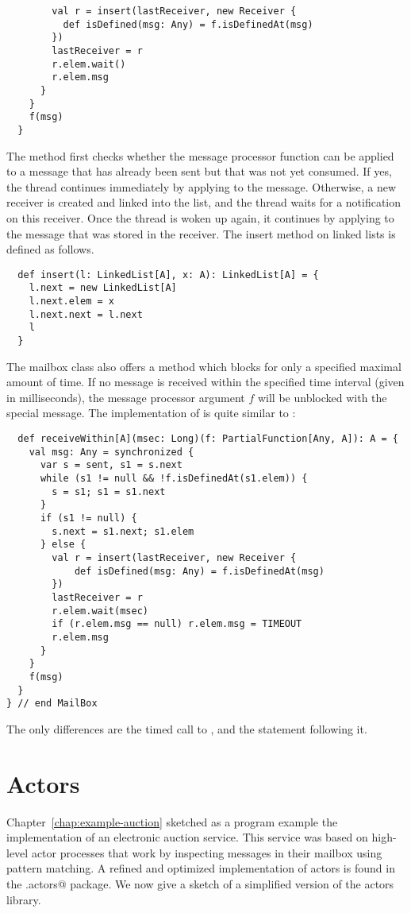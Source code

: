 {\begin{lstlisting}
        val r = insert(lastReceiver, new Receiver {
          def isDefined(msg: Any) = f.isDefinedAt(msg)
        })
        lastReceiver = r
        r.elem.wait()
        r.elem.msg
      }
    }
    f(msg)
  }
\end{lstlisting}
The  method first checks whether the message processor function
 can be applied to a message that has already been sent but that
was not yet consumed. If yes, the thread continues immediately by
applying  to the message. Otherwise, a new receiver is created
and linked into the  list, and the thread waits for a
notification on this receiver. Once the thread is woken up again, it
continues by applying  to the message that was stored in the
receiver. The insert method on linked lists is defined as follows.
\begin{lstlisting}
  def insert(l: LinkedList[A], x: A): LinkedList[A] = {
    l.next = new LinkedList[A]
    l.next.elem = x
    l.next.next = l.next
    l
  }
\end{lstlisting}
The mailbox class also offers a method 
which blocks for only a specified maximal amount of time.  If no
message is received within the specified time interval (given in
milliseconds), the message processor argument $f$ will be unblocked
with the special  message.  The implementation of
 is quite similar to :
\begin{lstlisting}
  def receiveWithin[A](msec: Long)(f: PartialFunction[Any, A]): A = {
    val msg: Any = synchronized {
      var s = sent, s1 = s.next
      while (s1 != null && !f.isDefinedAt(s1.elem)) {
        s = s1; s1 = s1.next 
      }
      if (s1 != null) {
        s.next = s1.next; s1.elem
      } else {
        val r = insert(lastReceiver, new Receiver {
            def isDefined(msg: Any) = f.isDefinedAt(msg)
        })
        lastReceiver = r
        r.elem.wait(msec)
        if (r.elem.msg == null) r.elem.msg = TIMEOUT
        r.elem.msg
      }
    }
    f(msg)
  }
} // end MailBox
\end{lstlisting}
The only differences are the timed call to , and the
statement following it.

\section{Actors}
\label{sec:actors}

Chapter~\ref{chap:example-auction} sketched as a program example the
implementation of an electronic auction service. This service was
based on high-level actor processes that work by inspecting messages
in their mailbox using pattern matching. A refined and optimized
implementation of actors is found in the \lstinline@scala.actors@
package.  We now give a sketch of a simplified version of the actors library.

}
